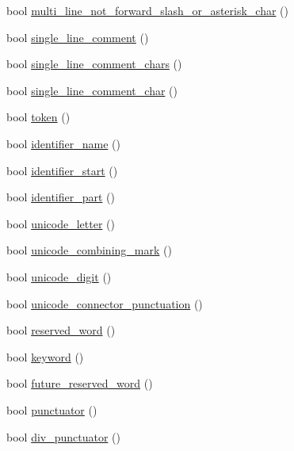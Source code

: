 \begin{DoxyCompactItemize}
\item 
bool \hyperlink{class_lexical_grammar_af0448c41bb8e0b33c87e4d649687a062}{multi\+\_\+line\+\_\+not\+\_\+forward\+\_\+slash\+\_\+or\+\_\+asterisk\+\_\+char} ()
\item 
bool \hyperlink{class_lexical_grammar_a3cca7bf99de3efe2e82b1ec05b091fe0}{single\+\_\+line\+\_\+comment} ()
\item 
bool \hyperlink{class_lexical_grammar_a39acd5ac2f507d10b9cd7eb905b6c6d9}{single\+\_\+line\+\_\+comment\+\_\+chars} ()
\item 
bool \hyperlink{class_lexical_grammar_a256890ff18017f982160830c3b08b4ac}{single\+\_\+line\+\_\+comment\+\_\+char} ()
\item 
bool \hyperlink{class_lexical_grammar_ac728c2390815a0710dcf393763771f2c}{token} ()
\item 
bool \hyperlink{class_lexical_grammar_a851951b0798abd9c6fdf0ae3e49d299b}{identifier\+\_\+name} ()
\item 
bool \hyperlink{class_lexical_grammar_af2c12dfb0b07685c3b01779e4ae4e359}{identifier\+\_\+start} ()
\item 
bool \hyperlink{class_lexical_grammar_a744e87b07d654b2769e5f0855b30c870}{identifier\+\_\+part} ()
\item 
bool \hyperlink{class_lexical_grammar_aee36e7e578912a00215f3a66778c191f}{unicode\+\_\+letter} ()
\item 
bool \hyperlink{class_lexical_grammar_ab16506f8bcae0aa05d7f6971d0355d9c}{unicode\+\_\+combining\+\_\+mark} ()
\item 
bool \hyperlink{class_lexical_grammar_a20b4e0f9757bcace278e8d711efb09da}{unicode\+\_\+digit} ()
\item 
bool \hyperlink{class_lexical_grammar_a632307d996a33ac3089d53068ba9c21d}{unicode\+\_\+connector\+\_\+punctuation} ()
\item 
bool \hyperlink{class_lexical_grammar_a1d60ff9552b12f9c30a9dc94b329530d}{reserved\+\_\+word} ()
\item 
bool \hyperlink{class_lexical_grammar_a609dc2ff60d85011034954b805ebd077}{keyword} ()
\item 
bool \hyperlink{class_lexical_grammar_a588be2892f65d3367dfd049174532c17}{future\+\_\+reserved\+\_\+word} ()
\item 
bool \hyperlink{class_lexical_grammar_a1d2f4fe7c1039c89dbbe4309f7a2d35a}{punctuator} ()
\item 
bool \hyperlink{class_lexical_grammar_a37ea4db956749e0519e34ec8e304d2fb}{div\+\_\+punctuator} ()
\item 

\end{DoxyCompactItemize}
